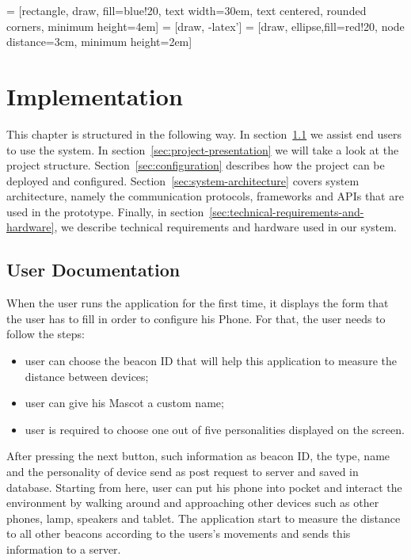  = [rectangle, draw, fill=blue!20, 
    text width=30em, text centered, rounded corners, minimum height=4em]
 = [draw, -latex']
 = [draw, ellipse,fill=red!20, node distance=3cm,
    minimum height=2em]

\chapter{Implementation}
\label{ch:implementation}
This chapter is structured in the following way.
In section~\ref{sec:user-documentation} we assist end users to use the system.
In section~\ref{sec:project-presentation} we will take a look at the project structure.
Section~\ref{sec:configuration} describes how the project can be deployed and configured.
Section~\ref{sec:system-architecture} covers system architecture, namely the
communication protocols, frameworks and APIs that are used in the prototype.
Finally, in section~\ref{sec:technical-requirements-and-hardware}, we describe technical
requirements and hardware used in our system.

\section{User Documentation}
\label{sec:user-documentation}
When the user runs the application for the first time, it displays the form that the
user has to fill in order to configure his Phone.
For that, the user needs to follow the steps:

\begin{itemize}
    \item user can choose the beacon ID that will help this application to measure the distance between devices;
    \item user can give his Mascot a custom name;
    \item user is required to choose one out of five personalities displayed on the screen.
\end{itemize}

After pressing the next button, such information as beacon ID,
the type, name and the personality of device send as post request to server and saved in database.
Starting from here, user can put his phone into pocket and interact the environment by walking
around and approaching other devices such as other phones, lamp, speakers and tablet.
The application start to measure the distance to all other beacons according to the users's
movements and sends this information to a server.

